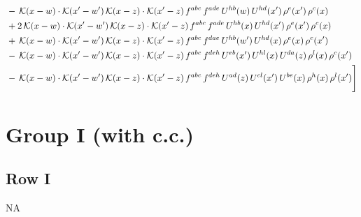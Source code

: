 \documentclass[9pt]{article}
\numberwithin{equation}{section}
\begin{document}
\begin{align}
&-\,\mathcal{K}(x-w)\cdot\mathcal{K}(x'-w')\,\mathcal{K}(x-z)\cdot\mathcal{K}(x'-z)\,f^{abc}\,f^{ade}\,U^{hb}(w)\,U^{hd}(x')\,\rho^{e}(x')\,\rho^{c}(x)\notag\\
&+2\,\mathcal{K}(x-w)\cdot\mathcal{K}(x'-w')\,\mathcal{K}(x-z)\cdot\mathcal{K}(x'-z)\,f^{abc}\,f^{ade}\,U^{hb}(x)\,U^{hd}(x')\,\rho^{e}(x')\,\rho^{c}(x)\notag\\
&+\,\mathcal{K}(x-w)\cdot\mathcal{K}(x'-w')\,\mathcal{K}(x-z)\cdot\mathcal{K}(x'-z)\,f^{abc}\,f^{dae}\,U^{hb}(w')\,U^{hd}(x)\,\rho^{e}(x)\,\rho^{c}(x')\notag\\
&-\,\mathcal{K}(x-w)\cdot\mathcal{K}(x'-w')\,\mathcal{K}(x-z)\cdot\mathcal{K}(x'-z)\,f^{abc}\,f^{deh}\,U^{eb}(x')\,U^{hl}(x)\,U^{da}(z)\,\rho^{l}(x)\,\rho^{c}(x')\notag\\
&-\,\mathcal{K}(x-w)\cdot\mathcal{K}(x'-w')\,\mathcal{K}(x-z)\cdot\mathcal{K}(x'-z)\,f^{abc}\,f^{deh}\,U^{ad}(z)\,U^{cl}(x')\,U^{be}(x)\,\rho^{h}(x)\,\rho^{l}(x')\Bigg]
\end{align}
\section{Group I (with c.c.)}
\subsection{Row I}
\textsc{NA}
\end{document}
